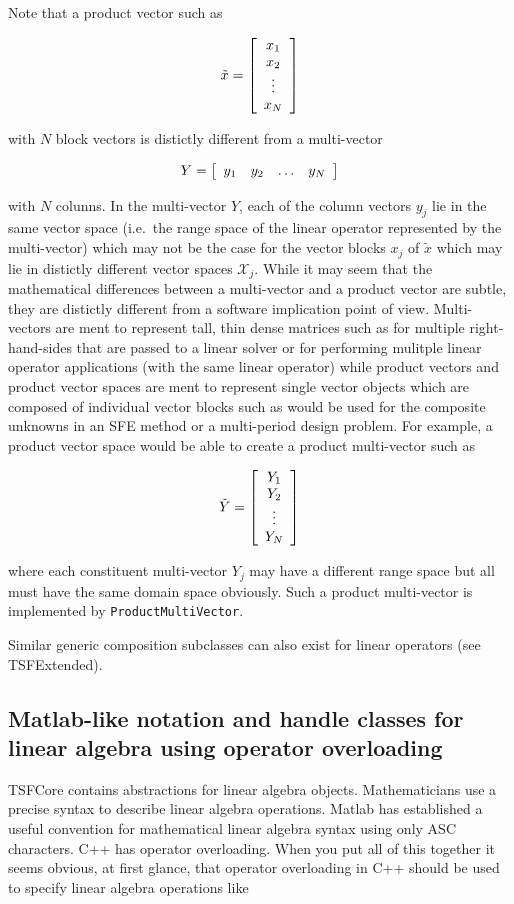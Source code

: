 Note that a product vector such as

\[
\tilde{x} = {\bmat{c} x_1 \\ x_2 \\ \vdots \\ x_N \emat}
\]

{}\noindent{}with $N$ block vectors is distictly different from a
multi-vector

\[
Y = {\bmat{cccc} y_1 & y_2 & \ldots & y_N \emat}
\]

{}\noindent{}with $N$ colunns.  In the multi-vector $Y$, each of the
column vectors $y_j$ lie in the same vector space (i.e.~the range
space of the linear operator represented by the multi-vector) which
may not be the case for the vector blocks $x_j$ of $\tilde{x}$ which
may lie in distictly different vector spaces $\mathcal{X}_j$.  While
it may seem that the mathematical differences between a multi-vector
and a product vector are subtle, they are distictly different from a
software implication point of view.  Multi-vectors are ment to
represent tall, thin dense matrices such as for multiple
right-hand-sides that are passed to a linear solver or for performing
mulitple linear operator applications (with the same linear operator)
while product vectors and product vector spaces are ment to represent
single vector objects which are composed of individual vector blocks
such as would be used for the composite unknowns in an SFE method or a
multi-period design problem.  For example, a product vector space
would be able to create a product multi-vector such as

\[
\tilde{Y} = {\bmat{c} Y_1 \\ Y_2 \\ \vdots \\ Y_N \emat}
\]

where each constituent multi-vector $Y_j$ may have a different range
space but all must have the same domain space obviously.  Such a
product multi-vector is implemented by
{}\texttt{Product\-Multi\-Vector}.

Similar generic composition subclasses can also exist for linear
operators (see TSFExtended).

%
\subsection{Matlab-like notation and handle classes for linear algebra
using operator overloading}
\label{tsfcore:sec:operator_overloading}
%

TSFCore contains abstractions for linear algebra objects.
Mathematicians use a precise syntax to describe linear algebra
operations.  Matlab {}\cite{ref:matlab} has established a useful
convention for mathematical linear algebra syntax using only ASC
characters.  C++ has operator overloading.  When you put all of this
together it seems obvious, at first glance, that operator overloading
in C++ should be used to specify linear algebra operations like


